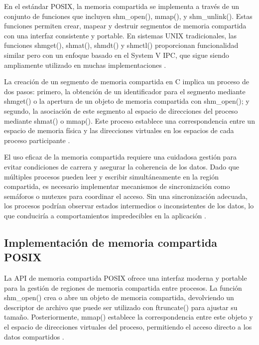 {En el estándar POSIX, la memoria compartida se implementa a través de un conjunto de funciones que incluyen shm\_open(), mmap(), y shm\_unlink(). Estas funciones permiten crear, mapear y destruir segmentos de memoria compartida con una interfaz consistente y portable. En sistemas UNIX tradicionales, las funciones shmget(), shmat(), shmdt() y shmctl() proporcionan funcionalidad similar pero con un enfoque basado en el System V IPC, que sigue siendo ampliamente utilizado en muchas implementaciones \cite{kerrisk2010linux}.
\vspace{10pt}

La creación de un segmento de memoria compartida en C implica un proceso de dos pasos: primero, la obtención de un identificador para el segmento mediante shmget() o la apertura de un objeto de memoria compartida con shm\_open(); y segundo, la asociación de este segmento al espacio de direcciones del proceso mediante shmat() o mmap(). Este proceso establece una correspondencia entre un espacio de memoria física y las direcciones virtuales en los espacios de cada proceso participante \cite{robbins2003unix}.
\vspace{10pt}

El uso eficaz de la memoria compartida requiere una cuidadosa gestión para evitar condiciones de carrera y asegurar la coherencia de los datos. Dado que múltiples procesos pueden leer y escribir simultáneamente en la región compartida, es necesario implementar mecanismos de sincronización como semáforos o mutexes para coordinar el acceso. Sin una sincronización adecuada, los procesos podrían observar estados intermedios o inconsistentes de los datos, lo que conduciría a comportamientos impredecibles en la aplicación \cite{tanenbaum2015modern}.

\subsection{Implementación de memoria compartida POSIX}

La API de memoria compartida POSIX ofrece una interfaz moderna y portable para la gestión de regiones de memoria compartida entre procesos. La función shm\_open() crea o abre un objeto de memoria compartida, devolviendo un descriptor de archivo que puede ser utilizado con ftruncate() para ajustar su tamaño. Posteriormente, mmap() establece la correspondencia entre este objeto y el espacio de direcciones virtuales del proceso, permitiendo el acceso directo a los datos compartidos \cite{stevens2005unix}.
\vspace{10pt}

}
